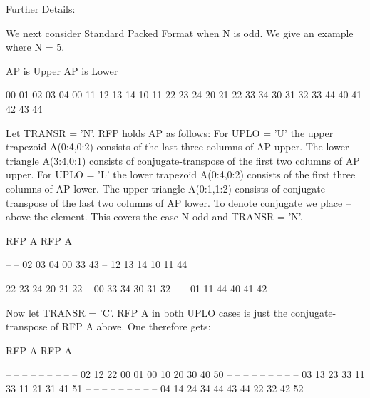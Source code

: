 \begin{DoxyParagraph}{Further Details\+: }
\begin{DoxyVerb}
  We next  consider Standard Packed Format when N is odd.
  We give an example where N = 5.

     AP is Upper                 AP is Lower

   00 01 02 03 04              00
      11 12 13 14              10 11
         22 23 24              20 21 22
            33 34              30 31 32 33
               44              40 41 42 43 44


  Let TRANSR = 'N'. RFP holds AP as follows:
  For UPLO = 'U' the upper trapezoid A(0:4,0:2) consists of the last
  three columns of AP upper. The lower triangle A(3:4,0:1) consists of
  conjugate-transpose of the first two   columns of AP upper.
  For UPLO = 'L' the lower trapezoid A(0:4,0:2) consists of the first
  three columns of AP lower. The upper triangle A(0:1,1:2) consists of
  conjugate-transpose of the last two   columns of AP lower.
  To denote conjugate we place -- above the element. This covers the
  case N odd  and TRANSR = 'N'.

         RFP A                   RFP A

                                   -- --
        02 03 04                00 33 43
                                      --
        12 13 14                10 11 44

        22 23 24                20 21 22
        --
        00 33 34                30 31 32
        -- --
        01 11 44                40 41 42

  Now let TRANSR = 'C'. RFP A in both UPLO cases is just the conjugate-
  transpose of RFP A above. One therefore gets:


           RFP A                   RFP A

     -- -- --                   -- -- -- -- -- --
     02 12 22 00 01             00 10 20 30 40 50
     -- -- -- --                   -- -- -- -- --
     03 13 23 33 11             33 11 21 31 41 51
     -- -- -- -- --                   -- -- -- --
     04 14 24 34 44             43 44 22 32 42 52\end{DoxyVerb}
 
\end{DoxyParagraph}
